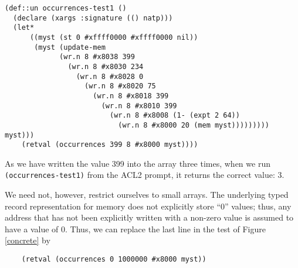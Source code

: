 \documentclass{eptcs}
\begin{document}
\begin{figure*}
\begin{verbatim}
(def::un occurrences-test1 ()
  (declare (xargs :signature (() natp)))
  (let*
      ((myst (st 0 #xffff0000 #xffff0000 nil))
       (myst (update-mem
             (wr.n 8 #x8038 399
               (wr.n 8 #x8030 234
                 (wr.n 8 #x8028 0
                   (wr.n 8 #x8020 75
                     (wr.n 8 #x8018 399
                       (wr.n 8 #x8010 399
                         (wr.n 8 #x8008 (1- (expt 2 64))
                           (wr.n 8 #x8000 20 (mem myst))))))))) myst)))
    (retval (occurrences 399 8 #x8000 myst))))
\end{verbatim}
\hrulefill
\caption{Concrete test case for the translated occurrences example.}
\label{concrete}
\end{figure*}

As we have written the value 399 into the array three times, when we
run \texttt{(occurrences-test1)} from the ACL2 prompt, it returns the
correct value: 3.

We need not, however, restrict ourselves to small arrays.  The
underlying typed record representation for memory does not explicitly
store ``0'' values; thus, any address that has not been explicitly
written with a non-zero value is assumed to have a value of 0.  Thus, 
we can replace the last line in the test of Figure \ref{concrete} by

\begin{verbatim}
    (retval (occurrences 0 1000000 #x8000 myst))
\end{verbatim}
\end{document}
